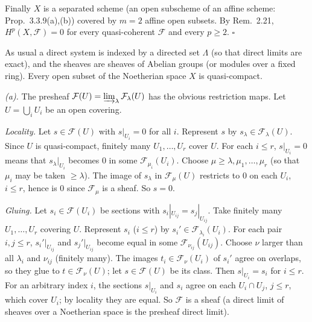 \documentclass[11pt]{article}
\begin{document}
Finally $X$ is a separated scheme (an open subscheme of an affine scheme: Prop.~3.3.9(a),(b)) covered by $m=2$ affine open subsets. By Rem.~2.21, $H^p(X,\mathcal F)=0$ for every quasi-coherent $\mathcal F$ and every $p\ge2$. \hfill$\square$

\pf
As usual a direct system is indexed by a directed set $\Lambda$ (so that direct limits are exact), and the sheaves are sheaves of Abelian groups (or modules over a fixed ring). Every open subset of the Noetherian space $X$ is quasi-compact.

\emph{(a).} The presheaf $\mathcal F(U)=\varinjlim_\lambda\mathcal F_\lambda(U)$ has the obvious restriction maps. Let $U=\bigcup_iU_i$ be an open covering.

\emph{Locality.} Let $s\in\mathcal F(U)$ with $s|_{U_i}=0$ for all $i$. Represent $s$ by $s_\lambda\in\mathcal F_\lambda(U)$. Since $U$ is quasi-compact, finitely many $U_1,\dots,U_r$ cover $U$. For each $i\le r$, $s|_{U_i}=0$ means that $s_\lambda|_{U_i}$ becomes $0$ in some $\mathcal F_{\mu_i}(U_i)$. Choose $\mu\ge\lambda,\mu_1,\dots,\mu_r$ (so that $\mu_i$ may be taken $\ge\lambda$). The image of $s_\lambda$ in $\mathcal F_\mu(U)$ restricts to $0$ on each $U_i$, $i\le r$, hence is $0$ since $\mathcal F_\mu$ is a sheaf. So $s=0$.

\emph{Gluing.} Let $s_i\in\mathcal F(U_i)$ be sections with $s_i|_{U_{ij}}=s_j|_{U_{ij}}$. Take finitely many $U_1,\dots,U_r$ covering $U$. Represent $s_i$ ($i\le r$) by $s_i'\in\mathcal F_{\lambda_i}(U_i)$. For each pair $i,j\le r$, $s_i'|_{U_{ij}}$ and $s_j'|_{U_{ij}}$ become equal in some $\mathcal F_{\nu_{ij}}(U_{ij})$. Choose $\nu$ larger than all $\lambda_i$ and $\nu_{ij}$ (finitely many). The images $t_i\in\mathcal F_\nu(U_i)$ of $s_i'$ agree on overlaps, so they glue to $t\in\mathcal F_\nu(U)$; let $s\in\mathcal F(U)$ be its class. Then $s|_{U_i}=s_i$ for $i\le r$. For an arbitrary index $i$, the sections $s|_{U_i}$ and $s_i$ agree on each $U_i\cap U_j$, $j\le r$, which cover $U_i$; by locality they are equal. So $\mathcal F$ is a sheaf (a direct limit of sheaves over a Noetherian space is the presheaf direct limit).
\end{document}

